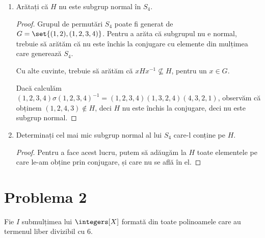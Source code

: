 \begin{enumerate}
    \item Arătați că \(H\) nu este subgrup normal în \(S_4\).
    \begin{proof}
    Grupul de permutări \(S_4\) poate fi generat de \(G = \set{ (1, 2), (1, 2, 3, 4) }\). Pentru a arăta că subgrupul nu e normal, trebuie să arătăm că nu este închis la conjugare cu elemente din mulțimea care generează \(S_4\).

    Cu alte cuvinte, trebuie să arătăm că \(x H x^{-1} \not\subseteq H\), pentru un \(x \in G\).

    Dacă calculăm \((1, 2, 3, 4) \sigma (1, 2, 3, 4)^{-1} = (1, 2, 3, 4) (1, 3, 2, 4) (4, 3, 2, 1)\), observăm că obținem \((1, 2, 4, 3) \not\in H\), deci \(H\) nu este închis la conjugare, deci nu este subgrup normal.
    \end{proof}

    \item Determinați cel mai mic subgrup normal al lui \(S_4\) care-l conține pe \(H\).
    \begin{proof}
    Pentru a face acest lucru, putem să adăugăm la \(H\) toate elementele pe care le-am obține prin conjugare, și care nu se află în el.
    \end{proof}
\end{enumerate}

\section*{Problema 2}

Fie \(I\) submulțimea lui \(\integers[X]\) formată din toate polinoamele care au termenul liber divizibil cu 6.

